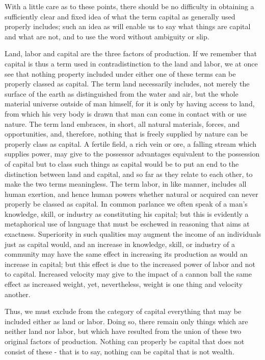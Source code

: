 With a little care as to these points, there should be no difficulty in
obtaining a sufficiently clear and fixed idea of what the term capital
as generally used properly includes; such an idea as will enable us to
say what things are capital and what are not, and to use the word
without ambiguity or slip.

Land, labor and capital are the three factors of production. If we
remember that capital is thus a term used in contradistinction to the
land and labor, we at once see that nothing property included under
either one of these terms can be properly classed as capital. The term
land necessarily includes, not merely the surface of the earth as
distinguished from the water and air, but the whole material universe
outside of man himself, for it is only by having access to land, from
which his very body is drawn that man can come in contact with or use
nature. The term land embraces, in short, all natural materials, forces,
and opportunities, and, therefore, nothing that is freely supplied by
nature can be properly class as capital. A fertile field, a rich vein or
ore, a falling stream which supplies power, may give to the possessor
advantages equivalent to the possession of capital but to class such
things as capital would be to put an end to the distinction between land
and capital, and so far as they relate to each other, to make the two
terms meaningless. The term labor, in like manner, includes all human
exertion, and hence human powers whether natural or acquired can never
properly be classed as capital. In common parlance we often speak of a
man's knowledge, skill, or industry as constituting his capital; but
this is evidently a metaphorical use of language that must be eschewed
in reasoning that aims at exactness. Superiority in such qualities may
augment the income of an individuals just as capital would, and an
increase in knowledge, skill, or industry of a community may have the
same effect in increasing its production as would an increase in
capital; but this effect is due to the increased power of labor and not
to capital. Increased velocity may give to the impact of a cannon ball
the same effect as increased weight, yet, nevertheless, weight is one
thing and velocity another.

Thus, we must exclude from the category of capital everything that may
be included either as land or labor. Doing so, there remain only things
which are neither land nor labor, but which have resulted from the union
of these two original factors of production. Nothing can properly be
capital that does not consist of these - that is to say, nothing can be
capital that is not wealth.

